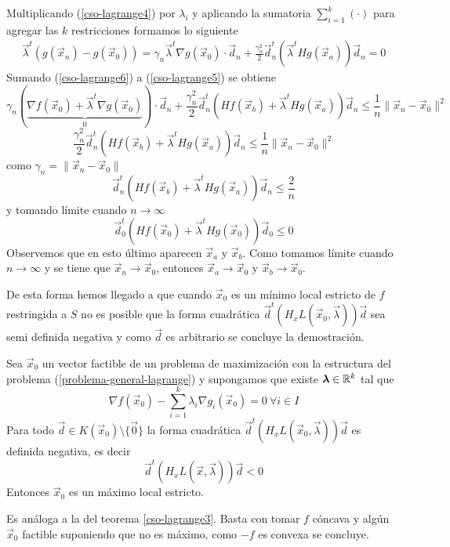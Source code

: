 \begin{demostracion}
Multiplicando (\ref{cso-lagrange4}) por $\lambda_i$ y aplicando la sumatoria $\sum_{i=1}^k (\cdot)$ para agregar las $k$ restricciones formamos lo siguiente
\begin{gather}\label{cso-lagrange6}
\vec{\lambda}^t (g(\vec{x}_n)-g(\vec{x}_0))=\gamma_n \vec{\lambda}^t \nabla g(\vec{x}_0)\cdot \vec{d}_n + \frac{\gamma_n^2}{2} \vec{d}_n^t (\vec{\lambda}^t H g(\vec{x}_a)) \vec{d}_n = 0 \tag{***}
\end{gather}
Sumando (\ref{cso-lagrange6}) a (\ref{cso-lagrange5}) se obtiene
$$\gamma_n (\underbrace{\nabla f(\vec{x}_0) + \vec{\lambda}^t \nabla g(\vec{x}_0)}_{0})\cdot \vec{d}_n + \frac{\gamma_n^2}{2} \vec{d}_n^t (H f(\vec{x}_b) + \vec{\lambda}^t H g(\vec{x}_a)) \vec{d}_n \leq \frac{1}{n}\|\vec{x}_n-\vec{x}_0\|^2$$
$$\frac{\gamma_n^2}{2} \vec{d}_n^t (H f(\vec{x}_b) + \vec{\lambda}^t H g(\vec{x}_a)) \vec{d}_n \leq \frac{1}{n}\|\vec{x}_n-\vec{x}_0\|^2$$
como $\gamma_n = \|\vec{x}_n - \vec{x}_0\|$
$$\vec{d}_n^t (H f(\vec{x}_b) + \vec{\lambda}^t H g(\vec{x}_a)) \vec{d}_n \leq \frac{2}{n}$$
y tomando l\'imite cuando $n\to \infty$
$$\vec{d}_0^t (H f(\vec{x}_0) + \vec{\lambda}^t H g(\vec{x}_0)) \vec{d}_0 \leq 0$$
Observemos que en esto \'ultimo aparecen $\vec{x}_a$ y $\vec{x}_b$. Como tomamos l\'imite cuando $n\to \infty$ y se tiene que $\vec{x}_n \to \vec{x}_0$, entonces $\vec{x}_a \to \vec{x}_0$ y $\vec{x}_b \to \vec{x}_0$.

De esta forma hemos llegado a que cuando $\vec{x}_0$ es un m\'inimo local estricto de $f$ restringida a $S$ no es posible que la forma cuadr\'atica $\vec{d}^t(H_x L(\vec{x}_0,\vec{\lambda}))\vec{d}$ sea semi definida negativa y como $\vec{d}$ es arbitrario se concluye la demostraci\'on.
\end{demostracion}

\begin{teorema}\label{cso-lagrange33}
Sea $\vec{x}_0$ un vector factible de un problema de maximizaci\'on con la estructura del problema (\ref{problema-general-lagrange}) y supongamos que existe $\boldsymbol{\lambda} \in \mathbb{R}^k$ tal que
$$\nabla f(\vec{x}_0) - \sum_{i=1}^k \lambda_i \nabla g_i(\vec{x}_0)=0 \: \forall i\in I$$
Para todo $\vec{d} \in K(\vec{x}_0)\setminus \{\vec{0}\}$ la forma cuadr\'atica $\vec{d}^t (H_x L(\vec{x}_0,\vec{\lambda})) \vec{d}$ es definida negativa, es decir
$$\vec{d}^t (H_x L(\vec{x},\vec{\lambda})) \vec{d} < 0$$
Entonces $\vec{x}_0$ es un m\'aximo local estricto.
\end{teorema}

\begin{demostracion}
Es an\'aloga a la del teorema \ref{cso-lagrange3}. Basta con tomar $f$ c\'oncava y alg\'un $\vec{x}_0$ factible suponiendo que no es m\'aximo, como $-f$ es convexa se concluye. 
\end{demostracion}

